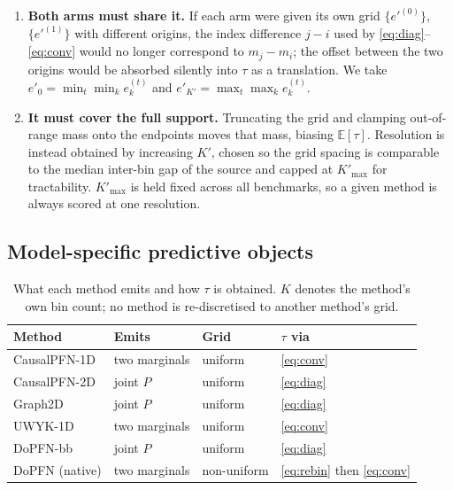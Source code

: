 \begin{enumerate}
\item \textbf{Both arms must share it.} If each arm were given its own grid
      $\{e'^{(0)}\}$, $\{e'^{(1)}\}$ with different origins, the index
      difference $j-i$ used by \eqref{eq:diag}--\eqref{eq:conv} would no
      longer correspond to $m_j - m_i$; the offset between the two origins
      would be absorbed silently into $\tau$ as a translation. We take
      $e'_0 = \min_t \min_k e^{(t)}_k$ and
      $e'_{K'} = \max_t \max_k e^{(t)}_k$.
\item \textbf{It must cover the full support.} Truncating the grid and
      clamping out-of-range mass onto the endpoints moves that mass, biasing
      $\mathbb{E}[\tau]$. Resolution is instead obtained by increasing $K'$,
      chosen so the grid spacing is comparable to the median inter-bin gap of
      the source and capped at $K'_{\max}$ for tractability. $K'_{\max}$ is
      held fixed across all benchmarks, so a given method is always scored at
      one resolution.
\end{enumerate}

\subsection{Model-specific predictive objects}
\label{app:models}

\begin{table}[h]
\centering
\caption{What each method emits and how $\tau$ is obtained. $K$ denotes the
method's own bin count; no method is re-discretised to another method's grid.}
\label{tab:heads}
\small
\begin{tabular}{llll}
\toprule
Method & Emits & Grid & $\tau$ via \\
\midrule
CausalPFN-1D & two marginals & uniform & \eqref{eq:conv} \\
CausalPFN-2D & joint $P$ & uniform & \eqref{eq:diag} \\
Graph2D & joint $P$ & uniform & \eqref{eq:diag} \\
UWYK-1D & two marginals & uniform & \eqref{eq:conv} \\
DoPFN-bb & joint $P$ & uniform & \eqref{eq:diag} \\
DoPFN (native) & two marginals & non-uniform & \eqref{eq:rebin} then \eqref{eq:conv} \\
\bottomrule
\end{tabular}
\end{table}

